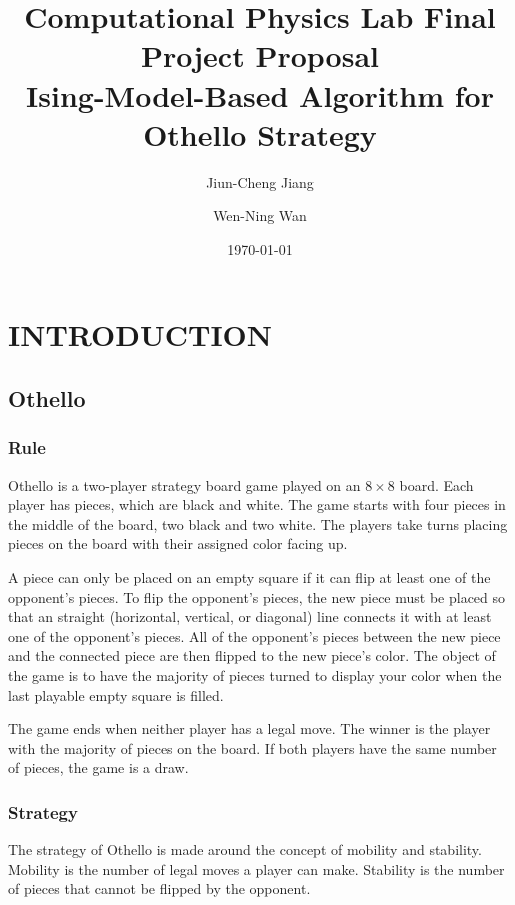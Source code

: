 \documentclass[aps,pra,reprint,amsmath,amssymb,floatfix]{revtex4-2}
\begin{document}

\title{Computational Physics Lab Final Project Proposal\\Ising-Model-Based Algorithm for Othello Strategy}
\author{Jiun-Cheng Jiang}
\author{Wen-Ning Wan}
\date{\today}

\maketitle

\section{INTRODUCTION}
\subsection{Othello}
\subsubsection{Rule}
Othello is a two-player strategy board game played on an $8\times8$ board. Each player has pieces, which are black and white. The game starts with four pieces in the middle of the board, two black and two white. The players take turns placing pieces on the board with their assigned color facing up. 

A piece can only be placed on an empty square if it can flip at least one of the opponent's pieces. To flip the opponent's pieces, the new piece must be placed so that an straight (horizontal, vertical, or diagonal) line connects it with at least one of the opponent's pieces. All of the opponent's pieces between the new piece and the connected piece are then flipped to the new piece's color. The object of the game is to have the majority of pieces turned to display your color when the last playable empty square is filled. 

The game ends when neither player has a legal move. The winner is the player with the majority of pieces on the board. If both players have the same number of pieces, the game is a draw.

\subsubsection{Strategy}\label{sec:othello_strategy}
The strategy of Othello is made around the concept of mobility and stability. Mobility is the number of legal moves a player can make. Stability is the number of pieces that cannot be flipped by the opponent.
\end{document}
